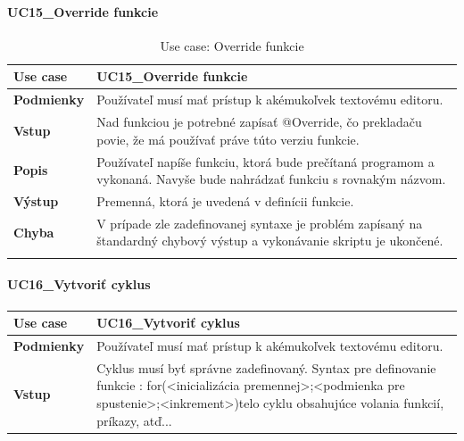 {\begin{center}
\begin{longtable}{|p{2.5cm}|p{12.2cm}|}
	\end{longtable}
\end{center}
\paragraph{UC15\_Override funkcie}
\begin{center}
	\begin{longtable}{|p{2.5cm}|p{12.2cm}|}
		
			\hline
			\textbf{Use case} & UC15\_Override funkcie \\ 
			\hline
			\textbf{Podmienky} & Používateľ musí mať prístup k akémukoľvek textovému editoru.  \\ 
			\hline
			\textbf{Vstup} & Nad funkciou je potrebné zapísať @Override,  čo prekladaču povie, že má používať práve túto verziu funkcie.\\
			\hline
			
			\textbf{Popis} & Používateľ napíše funkciu, ktorá bude prečítaná programom a vykonaná. Navyše bude nahrádzať funkciu s rovnakým názvom.\\ 
			\hline
			\textbf{Výstup} & Premenná, ktorá je uvedená v definícii funkcie.\\
			\hline
			\textbf{Chyba} & V prípade zle zadefinovanej syntaxe je problém zapísaný na štandardný chybový výstup a vykonávanie skriptu je ukončené.\\
			\hline
		\caption{Use case: Override funkcie}
		\label{table:1}
		
	\end{longtable}
\end{center}
\paragraph{UC16\_Vytvoriť cyklus}
\begin{center}
	\begin{longtable}{|p{2.5cm}|p{12.2cm}|}
		
			\hline
			\textbf{Use case} & UC16\_Vytvoriť cyklus \\ 
			\hline
			\textbf{Podmienky} & Používateľ musí mať prístup k akémukoľvek textovému editoru.  \\ 
			\hline
			\textbf{Vstup} & Cyklus musí byť správne zadefinovaný. 
			Syntax pre definovanie funkcie : 
			\newline
			for(<inicializácia premennej>;<podmienka pre spustenie>;<inkrement>){telo cyklu obsahujúce volania funkcií, príkazy, atď..}. \\
			\hline


\end{longtable}
\end{center}}
